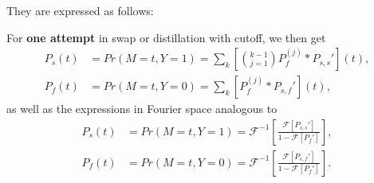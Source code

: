 \documentclass{masterthesis}
\begin{document}
They are expressed as follows:


For \textbf{one attempt} in swap or distillation with cutoff, we then get
\begin{align}
    P_{s}(t) &= Pr(M=t, Y=1) = \sum_{k}\left[\binom{k-1}{j=1} P_{f}^{(j)} * P_{s, s}'\right](t), \\
    P_{f}(t) &= Pr(M=t, Y=0) = \sum_{k}\left[P_{f}^{(j)} * P_{s, f}'\right](t),
\end{align}
as well as the expressions in Fourier space analogous to
\begin{align}
    P_{s}(t) &= Pr(M=t, Y=1) = \mathcal{F}^{-1}\left[\frac{\mathcal{F}\left[P_{s, s}'\right]}{1-\mathcal{F}\left[P_{f}'\right]}\right], \\
    P_{f}(t) &= Pr(M=t, Y=0) = \mathcal{F}^{-1}\left[\frac{\mathcal{F}\left[P_{s, f}'\right]}{1-\mathcal{F}\left[P_{f}'\right]}\right].
\end{align}
\end{document}
